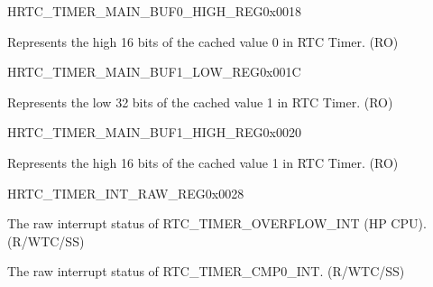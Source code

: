 \begin{register}{H}{RTC\_TIMER\_MAIN\_BUF0\_HIGH\_REG}{0x0018}\label{regdesc:RTCTIMERMAINBUF0HIGHREG}
%
%
\regnewline%
\begin{regdesc}\begin{reglist}
\label{fielddesc:RTCTIMERMAINTIMERBUF0HIGH}\item [RTC\_TIMER\_MAIN\_TIMER\_BUF0\_HIGH] Represents the high 16 bits of the cached value 0 in RTC Timer. (RO)
\end{reglist}\end{regdesc}
\end{register}


\begin{register}{H}{RTC\_TIMER\_MAIN\_BUF1\_LOW\_REG}{0x001C}\label{regdesc:RTCTIMERMAINBUF1LOWREG}
%
\regnewline%
\begin{regdesc}\begin{reglist}
\label{fielddesc:RTCTIMERMAINTIMERBUF1LOW}\item [RTC\_TIMER\_MAIN\_TIMER\_BUF1\_LOW] Represents the low 32 bits of the cached value 1 in RTC Timer. (RO)
\end{reglist}\end{regdesc}
\end{register}


\begin{register}{H}{RTC\_TIMER\_MAIN\_BUF1\_HIGH\_REG}{0x0020}\label{regdesc:RTCTIMERMAINBUF1HIGHREG}
%
%
\regnewline%
\begin{regdesc}\begin{reglist}
\label{fielddesc:RTCTIMERMAINTIMERBUF1HIGH}\item [RTC\_TIMER\_MAIN\_TIMER\_BUF1\_HIGH] Represents the high 16 bits of the cached value 1 in RTC Timer. (RO)
\end{reglist}\end{regdesc}
\end{register}

\begin{register}{H}{RTC\_TIMER\_INT\_RAW\_REG}{0x0028}\label{regdesc:RTCTIMERINTRAWREG}
%
%
%
\regnewline%
\begin{regdesc}\begin{reglist}
\label{fielddesc:RTCTIMEROVERFLOWRAW}\item [RTC\_TIMER\_OVERFLOW\_RAW] The raw interrupt status of RTC\_TIMER\_OVERFLOW\_INT (HP CPU). (R/WTC/SS)
\label{fielddesc:RTCTIMERSOCWAKEUPINTRAW}\item [RTC\_TIMER\_SOC\_WAKEUP\_INT\_RAW] The raw interrupt status of RTC\_TIMER\_CMP0\_INT. (R/WTC/SS)
\end{reglist}\end{regdesc}
\end{register}


